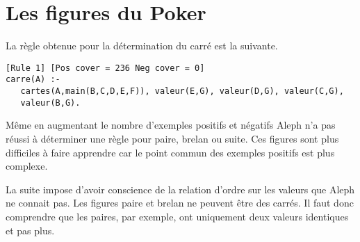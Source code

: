 \documentclass[a4paper,12pt]{article}
\begin{document}
\section{Les figures du Poker}

La règle obtenue pour la détermination du carré est la suivante.

\begin{lstlisting}[frame=single]
[Rule 1] [Pos cover = 236 Neg cover = 0]
carre(A) :-
   cartes(A,main(B,C,D,E,F)), valeur(E,G), valeur(D,G), valeur(C,G), 
   valeur(B,G).
\end{lstlisting}

Même en augmentant le nombre d'exemples positifs et négatifs Aleph n'a pas réussi à déterminer une règle pour paire, brelan ou suite.
Ces figures sont plus difficiles à faire apprendre car le point commun des exemples positifs est plus complexe.

La suite impose d'avoir conscience de la relation d'ordre sur les valeurs que Aleph ne connait pas.
Les figures paire et brelan ne peuvent être des carrés.
Il faut donc comprendre que les paires, par exemple, ont uniquement deux valeurs identiques et pas plus.
\end{document}
